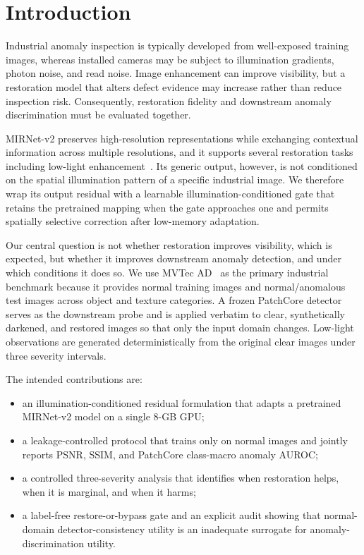 \documentclass[ASNA,twocolumn]{USG}
\begin{document}
\maketitle

\section{Introduction}
Industrial anomaly inspection is typically developed from well-exposed training images, whereas installed
cameras may be subject to illumination gradients, photon noise, and read noise. Image enhancement can
improve visibility, but a restoration model that alters defect evidence may increase rather than reduce
inspection risk. Consequently, restoration fidelity and downstream anomaly discrimination must be
evaluated together.

MIRNet-v2 preserves high-resolution representations while exchanging contextual information across
multiple resolutions, and it supports several restoration tasks including low-light
enhancement~\cite{zamir2023mirnetv2}. Its generic output, however, is not conditioned on the spatial
illumination pattern of a specific industrial image. We therefore wrap its output residual with a
learnable illumination-conditioned gate that retains the pretrained mapping when the gate approaches one
and permits spatially selective correction after low-memory adaptation.

Our central question is not whether restoration improves visibility, which is expected, but whether it
improves downstream anomaly detection, and under which conditions it does so. We use MVTec
AD~\cite{bergmann2019mvtecad} as the primary industrial benchmark because it provides normal training
images and normal/anomalous test images across object and texture categories. A frozen PatchCore
detector~\cite{roth2022patchcore} serves as the downstream probe and is applied verbatim to clear,
synthetically darkened, and restored images so that only the input domain changes. Low-light observations
are generated deterministically from the original clear images under three severity intervals.

The intended contributions are:
\begin{itemize}
    \item an illumination-conditioned residual formulation that adapts a pretrained MIRNet-v2 model on a
    single 8-GB GPU;
    \item a leakage-controlled protocol that trains only on normal images and jointly reports PSNR, SSIM,
    and PatchCore class-macro anomaly AUROC;
    \item a controlled three-severity analysis that identifies when restoration helps, when it is
    marginal, and when it harms;
    \item a label-free restore-or-bypass gate and an explicit audit showing that normal-domain
    detector-consistency utility is an inadequate surrogate for anomaly-discrimination utility.
\end{itemize}
\end{document}
